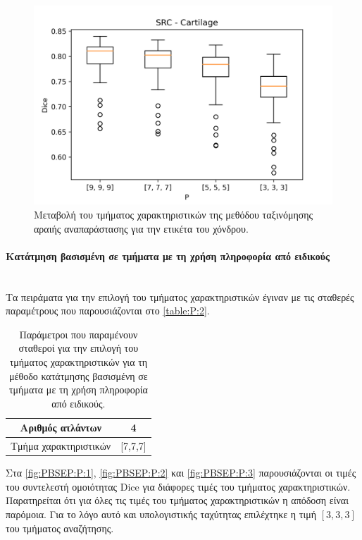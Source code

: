 \documentclass[a4paper,12pt]{article}
\newcommand{\paragraphLine}[1]{\paragraph{#1}\mbox{}\\}
\begin{document}
\begin{figure}[H]
    \centering
    \includegraphics[width=0.85\linewidth]{SRC_P_Cartilage_plot.png}
    \caption{Μεταβολή του τμήματος χαρακτηριστικών της μεθόδου ταξινόμησης
             αραιής αναπαράστασης για την ετικέτα του χόνδρου.}
    \label{fig:SRC:P:3}
\end{figure}

\paragraphLine{Κατάτμηση βασισμένη σε τμήματα με τη χρήση πληροφορία από
               ειδικούς}

Τα πειράματα για την επιλογή του τμήματος χαρακτηριστικών έγιναν με τις σταθερές
παραμέτρους που παρουσιάζονται στο \autoref{table:P:2}.

\begin{table}[h!]
    \centering
    \begin{tabular}{|c|c|} 
        \hline
        Αριθμός ατλάντων & 4 \\ 
        \hline
        Τμήμα χαρακτηριστικών & [7,7,7] \\ 
        \hline
    \end{tabular}
    \caption{Παράμετροι που παραμένουν σταθεροί για την επιλογή του τμήματος
             χαρακτηριστικών για τη μέθοδο κατάτμησης βασισμένη σε τμήματα με τη
             χρήση πληροφορία από ειδικούς.}
    \label{table:P:2}
\end{table}

Στα \autoref{fig:PBSEP:P:1}, \autoref{fig:PBSEP:P:2} και \autoref{fig:PBSEP:P:3}
παρουσιάζονται οι τιμές του συντελεστή ομοιότητας Dice για διάφορες τιμές του
τμήματος χαρακτηριστικών. Παρατηρείται ότι για όλες τις τιμές του τμήματος
χαρακτηριστικών η απόδοση είναι παρόμοια. Για το λόγο αυτό και υπολογιστικής
ταχύτητας επιλέχτηκε η τιμή $[3,3,3]$ του τμήματος αναζήτησης.
\end{document}
